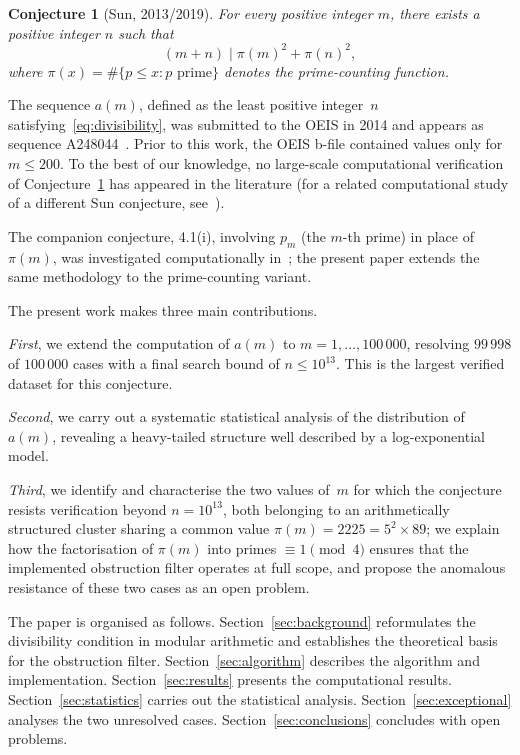 \documentclass[11pt]{article}
\newtheorem{conjecture}{Conjecture}
\theoremstyle{definition}
\theoremstyle{remark}
\numberwithin{equation}{section}
\begin{document}
\begin{conjecture}[Sun, 2013/2019]\label{conj:sun43i}
For every positive integer $m$, there exists a positive integer $n$
such that
\begin{equation}\label{eq:divisibility}
(m + n) \mid \pi(m)^2 + \pi(n)^2,
\end{equation}
where $\pi(x) = \#\{p \le x : p \text{ prime}\}$ denotes the
prime-counting function.
\end{conjecture}

The sequence $a(m)$, defined as the least positive integer~$n$
satisfying~\eqref{eq:divisibility}, was submitted to the OEIS in
2014 and appears as sequence A248044~\cite{OEIS_A248044}.
Prior to this work, the OEIS b-file contained values only for
$m \le 200$.
To the best of our knowledge, no large-scale computational
verification of Conjecture~\ref{conj:sun43i} has appeared in the
literature (for a related computational study of a different Sun
conjecture, see~\cite{MacTsop2021}).

The companion conjecture, 4.1(i), involving $p_m$ (the $m$-th prime)
in place of $\pi(m)$, was investigated computationally
in~\cite{CortiA247975}; the present paper extends the same
methodology to the prime-counting variant.

The present work makes three main contributions.

\emph{First}, we extend the computation of $a(m)$ to
$m = 1, \ldots, 100\,000$, resolving $99\,998$ of $100\,000$ cases
with a final search bound of $n \le 10^{13}$.  This is the largest
verified dataset for this conjecture.

\emph{Second}, we carry out a systematic statistical analysis of the
distribution of $a(m)$, revealing a heavy-tailed structure well
described by a log-exponential model.

\emph{Third}, we identify and characterise the two values of~$m$ for
which the conjecture resists verification beyond $n = 10^{13}$,
both belonging to an arithmetically structured cluster sharing a
common value $\pi(m) = 2225 = 5^2 \times 89$; we explain how the
factorisation of $\pi(m)$ into primes $\equiv 1 \pmod{4}$ ensures
that the implemented obstruction filter operates at full scope,
and propose the anomalous resistance of
these two cases as an open problem.

The paper is organised as follows.
Section~\ref{sec:background} reformulates the divisibility condition
in modular arithmetic and establishes the theoretical basis for the
obstruction filter.
Section~\ref{sec:algorithm} describes the algorithm and implementation.
Section~\ref{sec:results} presents the computational results.
Section~\ref{sec:statistics} carries out the statistical analysis.
Section~\ref{sec:exceptional} analyses the two unresolved cases.
Section~\ref{sec:conclusions} concludes with open problems.
\end{document}
